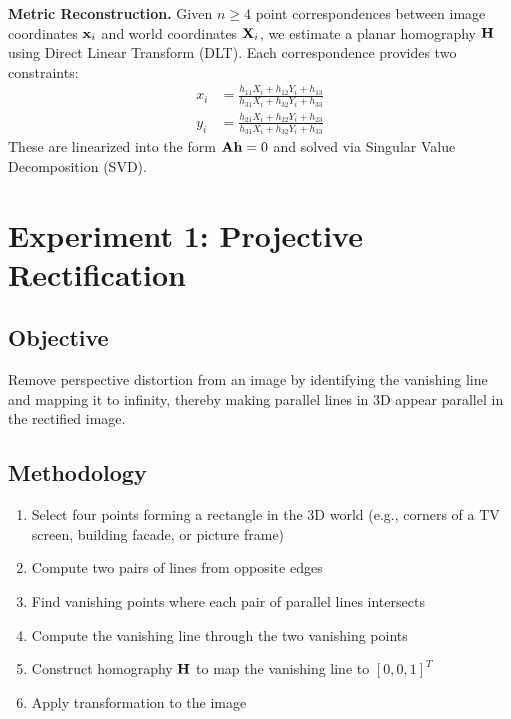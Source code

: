 \textbf{Metric Reconstruction.} Given $n \geq 4$ point correspondences between image coordinates $\mathbf{x}_i$ and world coordinates $\mathbf{X}_i$, we estimate a planar homography $\mathbf{H}$ using Direct Linear Transform (DLT). Each correspondence provides two constraints:
\begin{equation}
\begin{aligned}
    x_i &= \frac{h_{11}X_i + h_{12}Y_i + h_{13}}{h_{31}X_i + h_{32}Y_i + h_{33}} \\
    y_i &= \frac{h_{21}X_i + h_{22}Y_i + h_{23}}{h_{31}X_i + h_{32}Y_i + h_{33}}
\end{aligned}
\end{equation}
These are linearized into the form $\mathbf{A}\mathbf{h} = 0$ and solved via Singular Value Decomposition (SVD).

\section{Experiment 1: Projective Rectification}

\subsection{Objective}
Remove perspective distortion from an image by identifying the vanishing line and mapping it to infinity, thereby making parallel lines in 3D appear parallel in the rectified image.

\subsection{Methodology}
\begin{enumerate}
    \item Select four points forming a rectangle in the 3D world (e.g., corners of a TV screen, building facade, or picture frame)
    \item Compute two pairs of lines from opposite edges
    \item Find vanishing points where each pair of parallel lines intersects
    \item Compute the vanishing line through the two vanishing points
    \item Construct homography $\mathbf{H}$ to map the vanishing line to $[0, 0, 1]^T$
    \item Apply transformation to the image
\end{enumerate}

